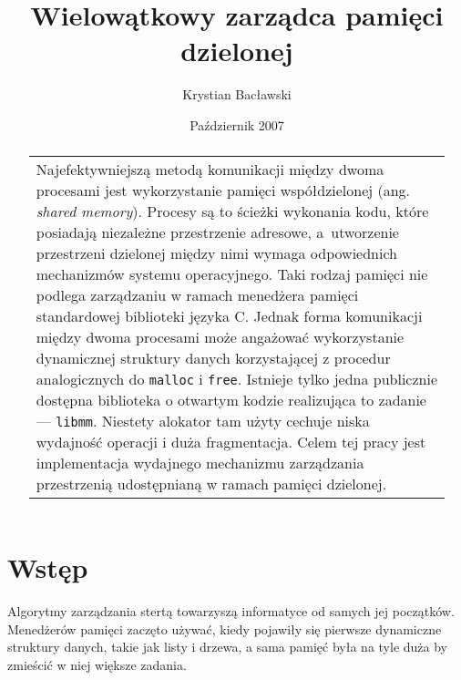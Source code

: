 \documentclass[12pt,a4paper,titlepage,twoside]{mwart}
\author{Krystian Bacławski}
\title{Wielowątkowy zarządca pamięci dzielonej}
\date{Październik 2007}
\begin{document}
\maketitle
\cleardoublepage


\begin{abstract}
\vspace{2ex}
\begin{center}
\begin{tabularx}{0.75\textwidth}{X}
Najefektywniejszą metodą komunikacji między dwoma procesami jest wykorzystanie
pamięci współdzielonej (ang.  \textit{shared memory}). Procesy są to ścieżki
wykonania kodu, które posiadają niezależne przestrzenie adresowe, a~utworzenie
przestrzeni dzielonej między nimi wymaga odpowiednich mechanizmów systemu
operacyjnego. Taki rodzaj pamięci nie podlega zarządzaniu w ramach menedżera
pamięci standardowej biblioteki języka C. Jednak forma komunikacji między dwoma
procesami może angażować wykorzystanie dynamicznej struktury danych
korzystającej z procedur analogicznych do \texttt{malloc} i \texttt{free}.
Istnieje tylko jedna publicznie dostępna biblioteka o otwartym kodzie
realizująca to zadanie --- \texttt{libmm}. Niestety alokator tam użyty cechuje
niska wydajność operacji i duża fragmentacja. Celem tej pracy jest
implementacja wydajnego mechanizmu zarządzania przestrzenią udostępnianą w
ramach pamięci dzielonej. 
\end{tabularx}
\end{center}
\end{abstract}

\cleardoublepage


\tableofcontents
\cleardoublepage


\setlength{\parindent}{0pt}
\setlength{\parskip}{1.2ex plus 0.5ex minus 0.2ex}

\section{Wstęp}

Algorytmy zarządzania stertą towarzyszą informatyce od samych jej początków.
Menedżerów pamięci zaczęto używać, kiedy pojawiły się pierwsze dynamiczne
struktury danych, takie jak listy i drzewa, a sama pamięć była na tyle duża by
zmieścić w niej większe zadania.
\end{document}
